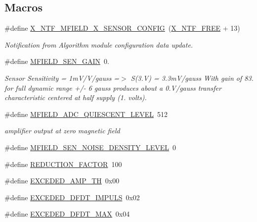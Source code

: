\subsection*{Macros}
\begin{DoxyCompactItemize}
\item 
\#define \hyperlink{a00019_aa16cf9dd51c7cbef48581b7862153ced}{X\+\_\+\+N\+T\+F\+\_\+\+M\+F\+I\+E\+L\+D\+\_\+\+X\+\_\+\+S\+E\+N\+S\+O\+R\+\_\+\+C\+O\+N\+F\+I\+G}~(\hyperlink{a00036_ab2eeea4643823a0c7c7731ddb83e3edc}{X\+\_\+\+N\+T\+F\+\_\+\+F\+R\+E\+E}  + 13)
\begin{DoxyCompactList}\small\item\em Notification from Algorithm module configuration data update. \end{DoxyCompactList}\item 
\#define \hyperlink{a00019_a0dbceb8ab2804359733a52568f2fd349}{M\+F\+I\+E\+L\+D\+\_\+\+S\+E\+N\+\_\+\+G\+A\+I\+N}~0.
\begin{DoxyCompactList}\small\item\em Sensor Sensitivity = 1m\+V/\+V/gauss =$>$ S(3.\+V) = 3.\+3m\+V/gauss With gain of 83. for full dynamic range +/-\/ 6 gauss produces about a 0.\+V/gauss transfer characteristic centered at half supply (1. volts). \end{DoxyCompactList}\item 
\#define \hyperlink{a00019_a2310c2bd339d54b86e9fae262def2008}{M\+F\+I\+E\+L\+D\+\_\+\+A\+D\+C\+\_\+\+Q\+U\+I\+E\+S\+C\+E\+N\+T\+\_\+\+L\+E\+V\+E\+L}~512
\begin{DoxyCompactList}\small\item\em amplifier output at zero magnetic field \end{DoxyCompactList}\item 
\#define \hyperlink{a00019_aafdb9e443a3251c41a62e1a1534673f9}{M\+F\+I\+E\+L\+D\+\_\+\+S\+E\+N\+\_\+\+N\+O\+I\+S\+E\+\_\+\+D\+E\+N\+S\+I\+T\+Y\+\_\+\+L\+E\+V\+E\+L}~0
\item 
\#define \hyperlink{a00019_a9c3f9296b977b6f4f9632c8430525738}{R\+E\+D\+U\+C\+T\+I\+O\+N\+\_\+\+F\+A\+C\+T\+O\+R}~100
\item 
\#define \hyperlink{a00019_a9c5372190518a7d696da393f1a9a5fb9}{E\+X\+C\+E\+D\+E\+D\+\_\+\+A\+M\+P\+\_\+\+T\+H}~0x00
\item 
\#define \hyperlink{a00019_abf943c473e214930a7be647c4c43b55d}{E\+X\+C\+E\+D\+E\+D\+\_\+\+D\+F\+D\+T\+\_\+\+I\+M\+P\+U\+L\+S}~0x02
\item 
\#define \hyperlink{a00019_afe7d875f6e5291e2b91df5c18af8789f}{E\+X\+C\+E\+D\+E\+D\+\_\+\+D\+F\+D\+T\+\_\+\+M\+A\+X}~0x04

\end{DoxyCompactItemize}

